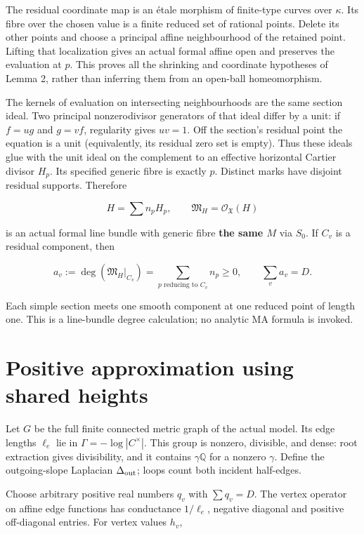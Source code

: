 \documentclass[
  11pt,
]{article}
\begin{document}
The residual coordinate map is an étale morphism of finite-type curves
over \(\kappa\). Its fibre over the chosen value is a finite reduced set
of rational points. Delete its other points and choose a principal
affine neighbourhood of the retained point. Lifting that localization
gives an actual formal affine open and preserves the evaluation at
\(p\). This proves all the shrinking and coordinate hypotheses of Lemma
2, rather than inferring them from an open-ball homeomorphism.

The kernels of evaluation on intersecting neighbourhoods are the same
section ideal. Two principal nonzerodivisor generators of that ideal
differ by a unit: if \(f=ug\) and \(g=vf\), regularity gives \(uv=1\).
Off the section's residual point the equation is a unit (equivalently,
its residual zero set is empty). Thus these ideals glue with the unit
ideal on the complement to an effective horizontal Cartier divisor
\(H_p\). Its specified generic fibre is exactly \(p\). Distinct marks
have disjoint residual supports. Therefore

\[
 H=\sum n_pH_p,\qquad \mathfrak M_H=\mathcal O_{\mathfrak X}(H)
\]

is an actual formal line bundle with generic fibre \textbf{the same
\(M\)} via \(S_0\). If \(C_v\) is a residual component, then

\[
 a_v:=\deg(\mathfrak M_H|_{C_v})
     =\sum_{p\text{ reducing to }C_v}n_p\geq0,
 \qquad \sum_va_v=D.
\]

Each simple section meets one smooth component at one reduced point of
length one. This is a line-bundle degree calculation; no analytic MA
formula is invoked.

\section{Positive approximation using shared
heights}\label{positive-approximation-using-shared-heights}

Let \(G\) be the full finite connected metric graph of the actual model.
Its edge lengths \(\ell_e\) lie in \(\Gamma=-\log|C^\times|\). This
group is nonzero, divisible, and dense: root extraction gives
divisibility, and it contains \(\gamma\mathbb Q\) for a nonzero
\(\gamma\). Define the outgoing-slope Laplacian \(\Delta_{\rm out}\);
loops count both incident half-edges.

Choose arbitrary positive real numbers \(q_v\) with \(\sum q_v=D\). The
vertex operator on affine edge functions has conductance \(1/\ell_e\),
negative diagonal and positive off-diagonal entries. For vertex values
\(h_v\),
\end{document}
